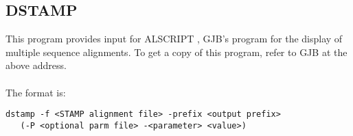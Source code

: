 \subsection{DSTAMP}

This program provides input for ALSCRIPT \cite{barton93a}, GJB's program
for the display of multiple sequence alignments.  To get a copy of
this program, refer to GJB at the above address.  \\
\\
The format is:\\

\begin{scriptsize}\begin{verbatim}
dstamp -f <STAMP alignment file> -prefix <output prefix> 
   (-P <optional parm file> -<parameter> <value>)
\end{verbatim} \end{scriptsize}

